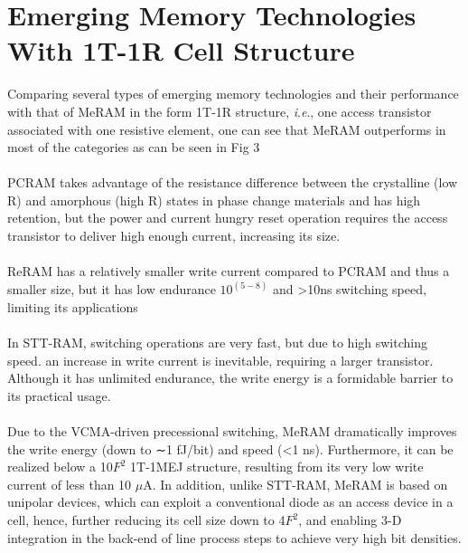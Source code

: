 \documentclass[a4paper, 12pt]{article}
\newcommand{\ie}{\textit{i}.\textit{e}., }
\begin{document}
\section{Emerging Memory Technologies With 1T-1R Cell Structure}
Comparing several types of emerging memory technologies and their performance with that of MeRAM in the form 1T-1R structure, \ie one access transistor associated with one resistive element, one can see that MeRAM outperforms in most of the categories as can be seen in Fig 3
\\
\\ PCRAM takes advantage of the resistance difference between the crystalline (low R) and amorphous (high R) states in phase change materials and has high retention, but the power and current hungry reset operation requires the access transistor to deliver high enough current, increasing its size.
\\
\\ReRAM has a relatively smaller write current compared to PCRAM and thus a smaller size, but it has low endurance $10^(5-8)$ and >10ns switching speed, limiting its applications
\\
\\In STT-RAM, switching operations are very fast, but due to high switching speed. an increase in write current is inevitable, requiring a larger transistor. Although it has unlimited endurance, the write energy is a formidable barrier to its practical usage.
\\
\\Due to the VCMA-driven precessional switching, MeRAM dramatically improves the write energy (down to ∼1 fJ/bit) and speed (<1 ns). Furthermore, it can be realized below a 10$F^2$ 1T-1MEJ structure, resulting from its very low write current of less than 10 $\mu$A. In addition, unlike STT-RAM, MeRAM is based on unipolar devices, which can exploit a conventional diode as an access device in a cell, hence, further reducing its cell size down to 4$F^2$, and enabling 3-D integration in the back-end of line process steps to achieve very high bit densities.
	
\end{document}
